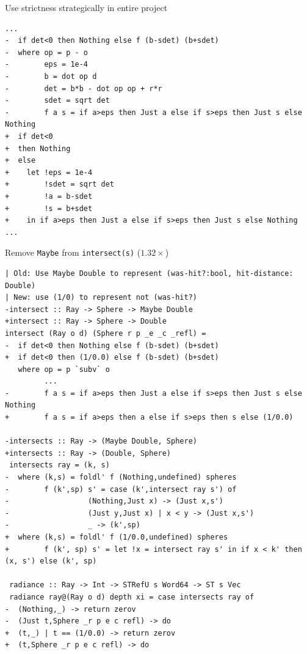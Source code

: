 \documentclass[8pt]{beamer}
\begin{document}

\begin{frame}[fragile]{Use strictness strategically in entire project}
\begin{verbatim}
...
-  if det<0 then Nothing else f (b-sdet) (b+sdet)
-  where op = p - o
-        eps = 1e-4
-        b = dot op d
-        det = b*b - dot op op + r*r
-        sdet = sqrt det
-        f a s = if a>eps then Just a else if s>eps then Just s else Nothing
+  if det<0
+  then Nothing
+  else
+    let !eps = 1e-4
+        !sdet = sqrt det
+        !a = b-sdet
+        !s = b+sdet
+    in if a>eps then Just a else if s>eps then Just s else Nothing
...
\end{verbatim}
\end{frame}



\begin{frame}[fragile]{Remove \texttt{Maybe} from \texttt{intersect(s)} ($1.32\times$)}
\begin{verbatim}
| Old: Use Maybe Double to represent (was-hit?:bool, hit-distance: Double)
| New: use (1/0) to represent not (was-hit?)
-intersect :: Ray -> Sphere -> Maybe Double
+intersect :: Ray -> Sphere -> Double
intersect (Ray o d) (Sphere r p _e _c _refl) =
-  if det<0 then Nothing else f (b-sdet) (b+sdet)
+  if det<0 then (1/0.0) else f (b-sdet) (b+sdet)
   where op = p `subv` o
         ...
-        f a s = if a>eps then Just a else if s>eps then Just s else Nothing
+        f a s = if a>eps then a else if s>eps then s else (1/0.0)

-intersects :: Ray -> (Maybe Double, Sphere)
+intersects :: Ray -> (Double, Sphere)
 intersects ray = (k, s)
-  where (k,s) = foldl' f (Nothing,undefined) spheres
-        f (k',sp) s' = case (k',intersect ray s') of
-                  (Nothing,Just x) -> (Just x,s')
-                  (Just y,Just x) | x < y -> (Just x,s')
-                  _ -> (k',sp)
+  where (k,s) = foldl' f (1/0.0,undefined) spheres
+        f (k', sp) s' = let !x = intersect ray s' in if x < k' then (x, s') else (k', sp)
 
 radiance :: Ray -> Int -> STRefU s Word64 -> ST s Vec
 radiance ray@(Ray o d) depth xi = case intersects ray of
-  (Nothing,_) -> return zerov
-  (Just t,Sphere _r p e c refl) -> do
+  (t,_) | t == (1/0.0) -> return zerov
+  (t,Sphere _r p e c refl) -> do
\end{verbatim}
\end{frame}
\end{document}
